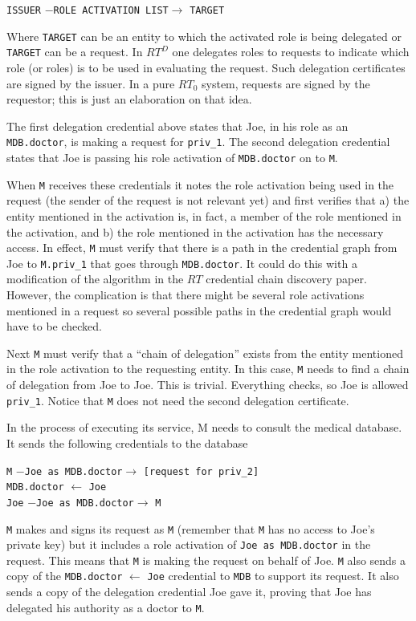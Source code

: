 \documentclass{article}
\begin{document}
\texttt{ISSUER} $-$\texttt{ROLE ACTIVATION LIST}$\rightarrow$ \texttt{TARGET}

Where \texttt{TARGET} can be an entity to which the activated role is being delegated or
\texttt{TARGET} can be a request. In $RT^D$ one delegates roles to requests to indicate which
role (or roles) is to be used in evaluating the request. Such delegation certificates are signed
by the issuer. In a pure $RT_0$ system, requests are signed by the requestor; this is just an
elaboration on that idea.

The first delegation credential above states that Joe, in his role as an \texttt{MDB.doctor}, is
making a request for \texttt{priv\_1}. The second delegation credential states that Joe is
passing his role activation of \texttt{MDB.doctor} on to \texttt{M}.

When \texttt{M} receives these credentials it notes the role activation being used in the
request (the sender of the request is not relevant yet) and first verifies that a) the entity
mentioned in the activation is, in fact, a member of the role mentioned in the activation, and
b) the role mentioned in the activation has the necessary access. In effect, \texttt{M} must
verify that there is a path in the credential graph from Joe to \texttt{M.priv\_1} that goes
through \texttt{MDB.doctor}. It could do this with a modification of the algorithm in the $RT$
credential chain discovery paper. However, the complication is that there might be several role
activations mentioned in a request so several possible paths in the credential graph would have
to be checked.

Next \texttt{M} must verify that a ``chain of delegation'' exists from the entity mentioned in
the role activation to the requesting entity. In this case, \texttt{M} needs to find a chain of
delegation from Joe to Joe. This is trivial. Everything checks, so Joe is allowed
\texttt{priv\_1}. Notice that \texttt{M} does not need the second delegation certificate.

In the process of executing its service, M needs to consult the medical database. It sends the
following credentials to the database

\texttt{M} $-$\texttt{Joe as MDB.doctor}$\rightarrow$ \texttt{[request for priv\_2]} \\
\texttt{MDB.doctor} $\leftarrow$ \texttt{Joe} \\
\texttt{Joe} $-$\texttt{Joe as MDB.doctor}$\rightarrow$ \texttt{M}

\texttt{M} makes and signs its request as \texttt{M} (remember that \texttt{M} has no access to
Joe's private key) but it includes a role activation of \texttt{Joe as MDB.doctor} in the
request. This means that \texttt{M} is making the request on behalf of Joe. \texttt{M} also
sends a copy of the \texttt{MDB.doctor} $\leftarrow$ \texttt{Joe} credential to \texttt{MDB} to
support its request. It also sends a copy of the delegation credential Joe gave it, proving that
Joe has delegated his authority as a doctor to \texttt{M}.
\end{document}
